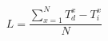 \documentclass{article}
\begin{document}
\begin{equation}\label{cepl}
   L = \frac{ \displaystyle \sum\limits_{x=1}^N {T_{d}^{x} - {T_{i}^{x} }} } {N} 
\end{equation}
\end{document}
